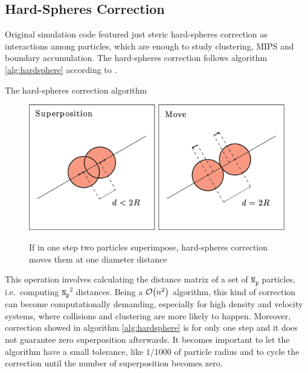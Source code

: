 \documentclass[../../master_thesis_np.tex]{subfiles}
\begin{document}
	\subsection{Hard-Spheres Correction}
	\label{hs}
	Original simulation code featured just steric hard-spheres correction as interactions among particles, which are enough to study clustering, MIPS and boundary accumulation.
	The hard-spheres correction follows algorithm \ref{alg:hardsphere} according to \cite{callegari_numerical_2019}.
	
	\begin{algorithm}[htp]
		\caption{The hard-spheres correction algorithm} \label{alg:hardsphere}	
		\begin{algorithmic}[1]
			 
			
			\EndIf
			\EndFor
		\end{algorithmic}
	\end{algorithm}
	
	\begin{figure}[htp]
		\centering
		\includegraphics[width = \textwidth]{callegari_volpe_2019_hardsphere.png}
		\label{fig:hardsphere}
		\caption{If in one step two particles superimpose, hard-spheres correction moves them at one diameter distance \cite{callegari_numerical_2019}}
	\end{figure}
	
	This operation involves calculating the distance matrix of a set of $\mathtt{N_p}$ particles, i.e.\ computing $\mathtt{N_p}^2$ distances.
	Being a $\order{n^2}$ algorithm, this kind of correction can become computationally demanding, especially for high density and velocity systems, where collisions and clustering are more likely to happen. 
	Moreover, correction showed in algorithm \ref{alg:hardsphere} is for only one step and it does not guarantee zero superposition afterwards.
	It becomes important to let the algorithm have a small tolerance, like $1/1000$ of particle radius and to cycle the correction until the number of superposition becomes zero.
	
\end{document}

